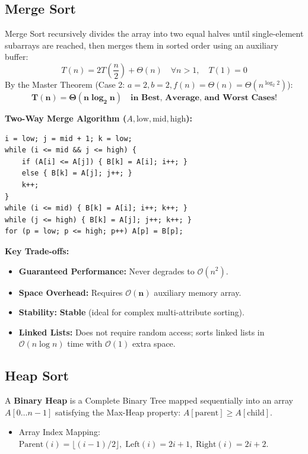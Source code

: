 \documentclass[12pt,a4paper]{article}
\begin{document}
\subsection{Merge Sort}
\begin{tcolorbox}[formulabox, title={\textbf{Merge Sort Algorithm and Guaranteed Bounds}}]
Merge Sort recursively divides the array into two equal halves until single-element subarrays are reached, then merges them in sorted order using an auxiliary buffer:
\begin{equation}
  T(n) = 2 T\left(\frac{n}{2}\right) + \Theta(n) \quad \forall n > 1, \quad T(1) = 0
\end{equation}
By the Master Theorem (Case 2: $a = 2, b = 2, f(n) = \Theta(n) = \Theta(n^{\log_2 2})$):
\begin{equation}
  \mathbf{T(n) = \Theta(n \log_2 n) \quad \text{in Best, Average, and Worst Cases!}}
\end{equation}
\par\vspace{2pt}\noindent
\textbf{Two-Way Merge Algorithm ($A, \text{low}, \text{mid}, \text{high}$):}
\begin{verbatim}
i = low; j = mid + 1; k = low;
while (i <= mid && j <= high) {
    if (A[i] <= A[j]) { B[k] = A[i]; i++; }
    else { B[k] = A[j]; j++; }
    k++;
}
while (i <= mid) { B[k] = A[i]; i++; k++; }
while (j <= high) { B[k] = A[j]; j++; k++; }
for (p = low; p <= high; p++) A[p] = B[p];
\end{verbatim}
\par\vspace{2pt}\noindent
\textbf{Key Trade-offs:}
\begin{itemize}[leftmargin=*, nosep]
  \item \textbf{Guaranteed Performance:} Never degrades to $\mathcal{O}(n^2)$.
  \item \textbf{Space Overhead:} Requires $\mathbf{\mathcal{O}(n)}$ auxiliary memory array.
  \item \textbf{Stability:} \textbf{Stable} (ideal for complex multi-attribute sorting).
  \item \textbf{Linked Lists:} Does not require random access; sorts linked lists in $\mathcal{O}(n \log n)$ time with $\mathcal{O}(1)$ extra space.
\end{itemize}
\end{tcolorbox}

\subsection{Heap Sort}
A \textbf{Binary Heap} is a Complete Binary Tree mapped sequentially into an array $A[0 \dots n-1]$ satisfying the Max-Heap property: $A[\text{parent}] \ge A[\text{child}]$.
\begin{itemize}[leftmargin=*, nosep]
  \item Array Index Mapping: $\text{Parent}(i) = \lfloor (i - 1)/2 \rfloor, \; \text{Left}(i) = 2i + 1, \; \text{Right}(i) = 2i + 2$.
\end{itemize}
\end{document}
